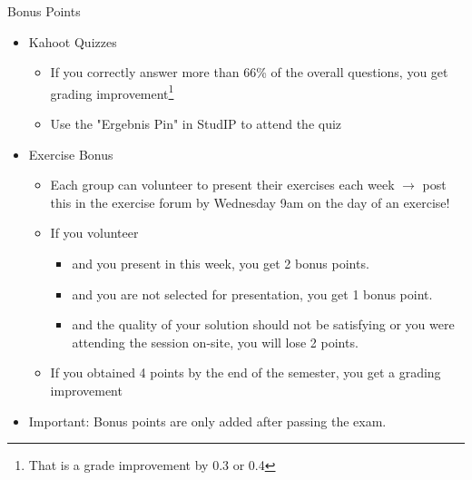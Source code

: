 \documentclass[aspectratio=169,handout]{../latex_main/tntbeamer}  %
\begin{document}
\begin{frame}[c]{Bonus Points}

\begin{itemize}
    \item Kahoot Quizzes
    \begin{itemize}
        \item If you correctly answer more than 66\% of the overall questions, you get grading improvement\footnote{That is a grade improvement by 0.3 or 0.4}
        \item Use the "Ergebnis Pin" in StudIP to attend the quiz
    \end{itemize}
    \item Exercise Bonus
    \begin{itemize}
        \item Each group can volunteer to present their exercises each week $\to$ post this in the exercise forum by \alert{Wednesday 9am} on the day of an exercise!
        \item If you volunteer\begin{itemize}
            \item and you present in this week, you get 2 bonus points.
            \item and you are not selected for presentation, you get 1 bonus point.
            \item and the quality of your solution should not be satisfying or you were attending the session on-site, you will lose 2 points.
        \end{itemize}
        \item If you obtained 4 points by the end of the semester, you get a grading improvement
    \end{itemize}
    \item \alert{Important:} Bonus points are only added \alert{after passing} the exam.
\end{itemize}

\end{frame}
\end{document}
